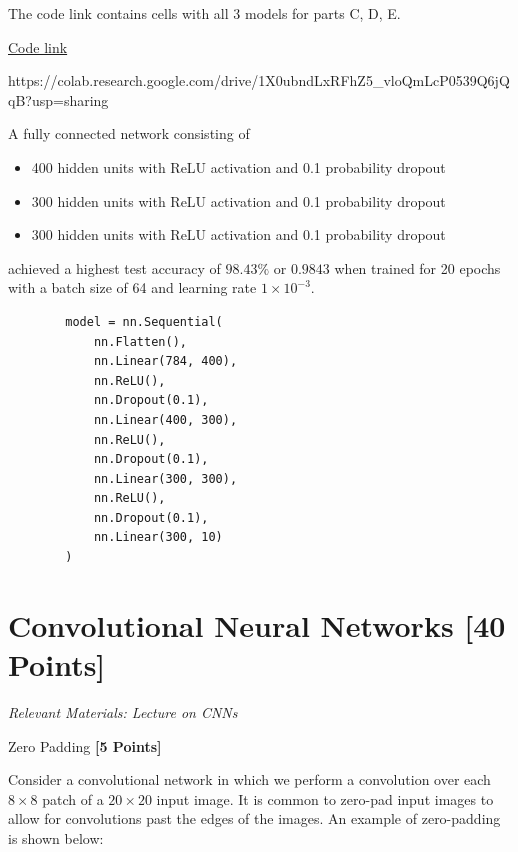 \begin{solution}
    The code link contains cells with all 3 models for parts C, D, E.

    \href{https://colab.research.google.com/drive/1X0ubndLxRFhZ5_vloQmLcP0539Q6jQqB?usp=sharing}{Code link}

    https://colab.research.google.com/drive/1X0ubndLxRFhZ5_vloQmLcP0539Q6jQqB?usp=sharing

    A fully connected network consisting of
    \begin{itemize}
        \item 400 hidden units with ReLU activation and 0.1 probability dropout
        \item 300 hidden units with ReLU activation and 0.1 probability dropout
        \item 300 hidden units with ReLU activation and 0.1 probability dropout
    \end{itemize}
    achieved a highest test accuracy of $98.43\%$ or $\boxed{0.9843}$ when trained for 20 epochs with a batch size of 64 and learning rate $1 \times 10^{-3}$.

    \begin{verbatim}
        model = nn.Sequential(
            nn.Flatten(),
            nn.Linear(784, 400),
            nn.ReLU(),
            nn.Dropout(0.1),
            nn.Linear(400, 300),
            nn.ReLU(),
            nn.Dropout(0.1),
            nn.Linear(300, 300),
            nn.ReLU(),
            nn.Dropout(0.1),
            nn.Linear(300, 10)
        )
    \end{verbatim}
\end{solution}

\newpage
\section{Convolutional Neural Networks  [40 Points]}
\textit{Relevant Materials: Lecture on CNNs}

\problem Zero Padding \textbf{[5 Points]}

Consider a convolutional network in which we perform a convolution over each $8 \times 8$ patch of a $20 \times 20$ input image. It is common to zero-pad input images to allow for convolutions past the edges of the images. An example of zero-padding is shown below:

